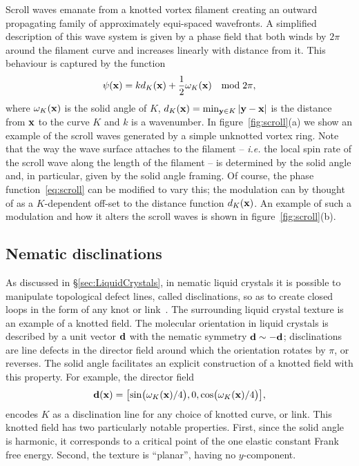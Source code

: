     Scroll waves emanate from a knotted vortex filament creating an outward propagating family of approximately equi-spaced wavefronts. A simplified description of this wave system is given by a phase field that both winds by $2\pi$ around the filament curve and increases linearly with distance from it. This behaviour is captured by the function 
    \begin{equation}
        \psi({\bf x}) = k d_{K}({\bf x}) + \frac{1}{2} \omega_{K}({\bf x}) \quad \textrm{mod}\; 2\pi ,
        \label{eq:scroll}
    \end{equation} 
    where $\omega_K({\bf x})$ is the solid angle of $K$, $d_{K}({\bf x}) = \min_{{\bf y} \in K} |{\bf y}-{\bf x}|$ is the distance from ${\bf x}$ to the curve $K$ and $k$ is a wavenumber. In figure~\ref{fig:scroll}(a) we show an example of the scroll waves generated by a simple unknotted vortex ring. 
    Note that the way the wave surface attaches to the filament -- {\sl i.e.} the local spin rate of the scroll wave along the length of the filament -- is determined by the solid angle and, in particular, given by the solid angle framing. Of course, the phase function~\eqref{eq:scroll} can be modified to vary this; the modulation can by thought of as a $K$-dependent off-set to the distance function $d_{K}({\bf x})$. An example of such a modulation and how it alters the scroll waves is shown in figure~\ref{fig:scroll}(b). 

    \subsection{Nematic disclinations}
    \label{subsec:nematics}

   As discussed in \S\ref{sec:LiquidCrystals}, in nematic liquid crystals it is possible to manipulate topological defect lines, called disclinations, so as to create closed loops in the form of any knot or link~\citep{Tkalec2011,Copar2015,Machon2013}. The surrounding liquid crystal texture is an example of a knotted field. The molecular orientation in liquid crystals is described by a unit vector ${\bf d}$ with the nematic symmetry ${\bf d} \sim - {\bf d}$; disclinations are line defects in the director field around which the orientation rotates by $\pi$, or reverses. The solid angle facilitates an explicit construction of a knotted field with this property. For example, the director field 
    \begin{equation}
        {\bf d}({\bf x}) = \bigl[ \sin\bigl( \omega_{K}({\bf x}) / 4 \bigr) , 0 , \cos\bigl( \omega_{K}({\bf x}) / 4 \bigr) \bigr], 
        \label{eq:planar_nematic}
    \end{equation}
    encodes $K$ as a disclination line for any choice of knotted curve, or link. This knotted field has two particularly notable properties. First, since the solid angle is harmonic, it corresponds to a critical point of the one elastic constant Frank free energy. Second, the texture is ``planar'', having no $y$-component. 
    
